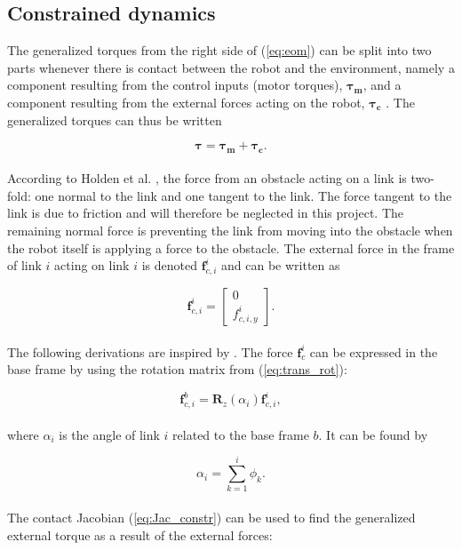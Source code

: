 
\subsection{Constrained dynamics}\label{subseq:constr_dyn}

The generalized torques from the right side of (\ref{eq:eom}) can be split into two parts whenever there is contact between the robot and the environment, namely a component resulting from the control inputs (motor torques), $\boldsymbol{\tau_{m}}$, and a component resulting from the external forces acting on the robot, $\boldsymbol{\tau_{c}}$ \cite{rezapour2014path}. The generalized torques can thus be written

\begin{equation}
    \boldsymbol{\tau} = \boldsymbol{\tau_{m}} + \boldsymbol{\tau_{c}}.
\end{equation}
\\
According to Holden et al. \cite{holden2014optimal}, the force from an obstacle acting on a link is two-fold: one normal to the link and one tangent to the link. The force tangent to the link is due to friction and will therefore be neglected in this project. The remaining normal force is preventing the link from moving into the obstacle when the robot itself is applying a force to the obstacle. The external force in the frame of link $i$ acting on link $i$ is denoted $\mathbf{f}^i_{c,i}$ and can be written as

\begin{equation}
    \mathbf{f}^i_{c,i}=
    \begin{bmatrix}
        0 \\
        f^i_{c,i,y}
    \end{bmatrix}.
\end{equation}
\\
The following derivations are inspired by \cite{rezapour2014path}. The force $\mathbf{f}^i_c$ can be expressed in the base frame by using the rotation matrix from (\ref{eq:trans_rot}):

\begin{equation}
    \mathbf{f}^b_{c,i} = \mathbf{R}_z(\alpha_i) \mathbf{f}^i_{c,i},
\end{equation}
\\
where $\alpha_i$ is the angle of link $i$ related to the base frame $b$. It can be found by 

\begin{equation}
    \alpha_i = \sum_{k=1}^{i} \phi_k.
\end{equation}
\\
The contact Jacobian (\ref{eq:Jac_constr}) can be used to find the generalized external torque as a result of the external forces:

